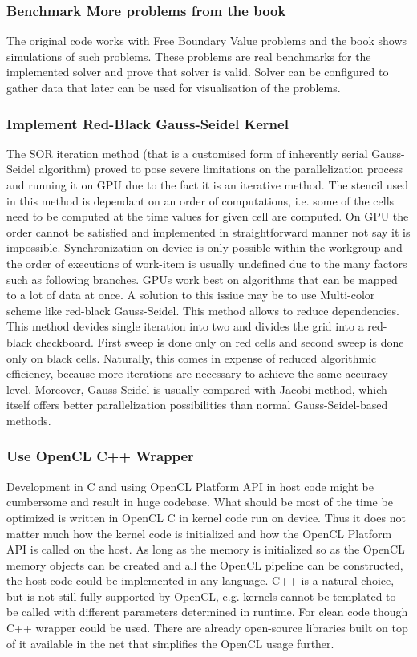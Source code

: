 \subsubsection{Benchmark More problems from the book}
The original code works with Free Boundary Value problems and the book shows simulations of such problems. These problems are real benchmarks for the implemented solver and prove that solver is valid. Solver can be configured to gather data that later can be used for visualisation of the problems.

\subsubsection{Implement Red-Black Gauss-Seidel Kernel}
The SOR iteration method (that is a customised form of inherently serial Gauss-Seidel algorithm) proved to pose severe limitations on the parallelization process and running it on GPU due to the fact it is an iterative method. The stencil used in this method is dependant on an order of computations, i.e. some of the cells need to be computed at the time values for given cell are computed. On GPU the order cannot be satisfied and implemented in straightforward manner not say it is impossible. Synchronization on device is only possible within the workgroup and the order of executions of work-item is usually undefined due to the many factors such as following branches. GPUs work best on algorithms that can be mapped to a lot of data at once. A solution to this issiue may be to use Multi-color scheme like red-black Gauss-Seidel. This method allows to reduce dependencies. This method devides single iteration into two and divides the grid into a red-black checkboard. First sweep is done only on red cells and second sweep is done only on black cells. Naturally, this comes in expense of reduced algorithmic efficiency, because more iterations are necessary to achieve the same accuracy level. Moreover, Gauss-Seidel is usually compared with Jacobi method, which itself offers better parallelization possibilities than normal Gauss-Seidel-based methods.

\subsubsection{Use OpenCL C++ Wrapper}
Development in C and using OpenCL Platform API in host code might be cumbersome and result in huge codebase. What should be most of the time be optimized is written in OpenCL C in kernel code run on device. Thus it does not matter much how the kernel code is initialized and how the OpenCL Platform API is called on the host. As long as the memory is initialized so as the OpenCL memory objects can be created and all the OpenCL pipeline can be constructed, the host code could be implemented in any language. C++ is a natural choice, but is not still fully supported by OpenCL, e.g. kernels cannot be templated to be called with different parameters determined in runtime. For clean code though C++ wrapper could be used. There are already open-source libraries built on top of it available in the net that simplifies the OpenCL usage further.

